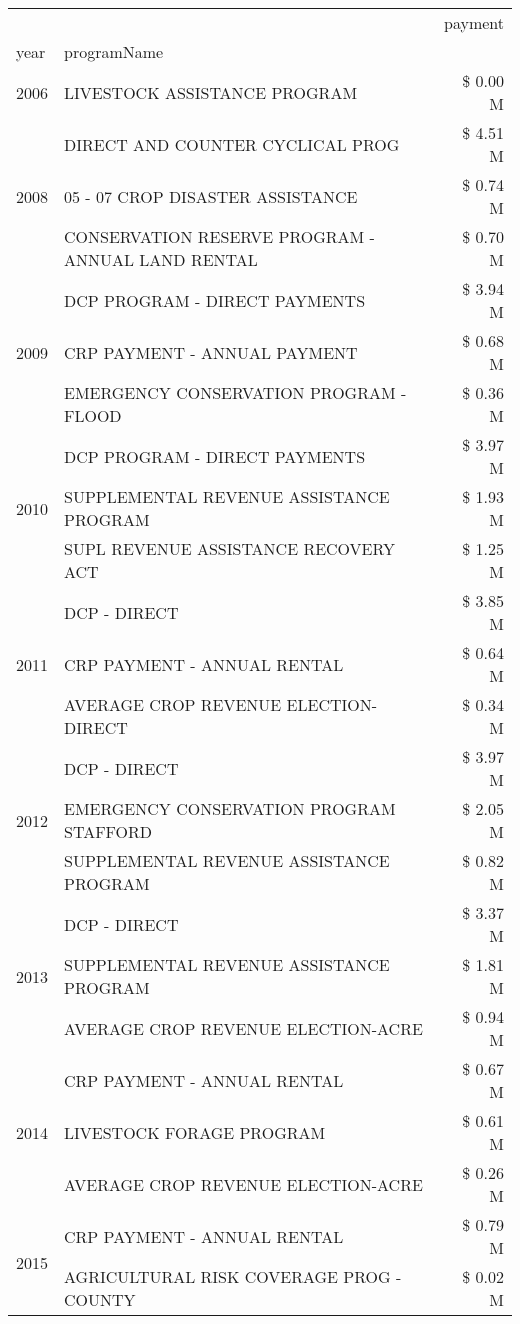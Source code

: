 \begin{tabular}{llr}
\toprule
 &  & payment \\
year & programName &  \\
\midrule
2006 & LIVESTOCK ASSISTANCE PROGRAM & \$ 0.00 M \\
\cline{1-3}
\multirow[t]{3}{*}{2008} & DIRECT AND COUNTER CYCLICAL PROG & \$ 4.51 M \\
 & 05 - 07 CROP DISASTER ASSISTANCE & \$ 0.74 M \\
 & CONSERVATION RESERVE PROGRAM - ANNUAL LAND RENTAL & \$ 0.70 M \\
\cline{1-3}
\multirow[t]{3}{*}{2009} & DCP PROGRAM - DIRECT PAYMENTS & \$ 3.94 M \\
 & CRP PAYMENT - ANNUAL PAYMENT & \$ 0.68 M \\
 & EMERGENCY CONSERVATION PROGRAM - FLOOD & \$ 0.36 M \\
\cline{1-3}
\multirow[t]{3}{*}{2010} & DCP PROGRAM - DIRECT PAYMENTS & \$ 3.97 M \\
 & SUPPLEMENTAL REVENUE ASSISTANCE PROGRAM & \$ 1.93 M \\
 & SUPL REVENUE ASSISTANCE RECOVERY ACT & \$ 1.25 M \\
\cline{1-3}
\multirow[t]{3}{*}{2011} & DCP - DIRECT & \$ 3.85 M \\
 & CRP PAYMENT - ANNUAL RENTAL & \$ 0.64 M \\
 & AVERAGE CROP REVENUE ELECTION-DIRECT & \$ 0.34 M \\
\cline{1-3}
\multirow[t]{3}{*}{2012} & DCP - DIRECT & \$ 3.97 M \\
 & EMERGENCY CONSERVATION PROGRAM STAFFORD & \$ 2.05 M \\
 & SUPPLEMENTAL REVENUE ASSISTANCE PROGRAM & \$ 0.82 M \\
\cline{1-3}
\multirow[t]{3}{*}{2013} & DCP - DIRECT & \$ 3.37 M \\
 & SUPPLEMENTAL REVENUE ASSISTANCE PROGRAM & \$ 1.81 M \\
 & AVERAGE CROP REVENUE ELECTION-ACRE & \$ 0.94 M \\
\cline{1-3}
\multirow[t]{3}{*}{2014} & CRP PAYMENT - ANNUAL RENTAL & \$ 0.67 M \\
 & LIVESTOCK FORAGE PROGRAM & \$ 0.61 M \\
 & AVERAGE CROP REVENUE ELECTION-ACRE & \$ 0.26 M \\
\cline{1-3}
\multirow[t]{3}{*}{2015} & CRP PAYMENT - ANNUAL RENTAL & \$ 0.79 M \\
 & AGRICULTURAL RISK COVERAGE PROG - COUNTY & \$ 0.02 M \\

\end{tabular}
